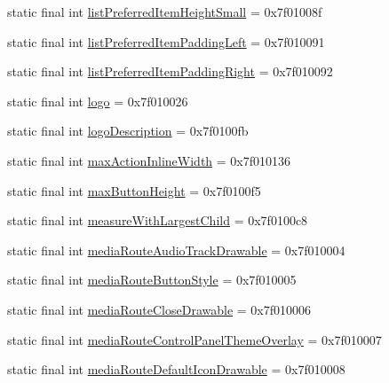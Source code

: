 \begin{CompactItemize}
\item 
static final int \hyperlink{classandroid_1_1support_1_1v7_1_1cardview_1_1_r_1_1attr_792da1eeef6f27123967a4cd0f42cfdf}{listPreferredItemHeightSmall} = 0x7f01008f
\item 
static final int \hyperlink{classandroid_1_1support_1_1v7_1_1cardview_1_1_r_1_1attr_8313b6168c0f795264cc752353fcb1e2}{listPreferredItemPaddingLeft} = 0x7f010091
\item 
static final int \hyperlink{classandroid_1_1support_1_1v7_1_1cardview_1_1_r_1_1attr_3029bf6174bce2f1c8516999074616a1}{listPreferredItemPaddingRight} = 0x7f010092
\item 
static final int \hyperlink{classandroid_1_1support_1_1v7_1_1cardview_1_1_r_1_1attr_1a58c8ae52263985ba349520bd1b1e27}{logo} = 0x7f010026
\item 
static final int \hyperlink{classandroid_1_1support_1_1v7_1_1cardview_1_1_r_1_1attr_024a5ac545ae24299cda4a30cd2bd0e1}{logoDescription} = 0x7f0100fb
\item 
static final int \hyperlink{classandroid_1_1support_1_1v7_1_1cardview_1_1_r_1_1attr_db6ef43310575c62b4c883cc7cd81e7f}{maxActionInlineWidth} = 0x7f010136
\item 
static final int \hyperlink{classandroid_1_1support_1_1v7_1_1cardview_1_1_r_1_1attr_470896082ba8fa7f73284b4773bbe6e7}{maxButtonHeight} = 0x7f0100f5
\item 
static final int \hyperlink{classandroid_1_1support_1_1v7_1_1cardview_1_1_r_1_1attr_91261c8906df5228943a8032a0daed07}{measureWithLargestChild} = 0x7f0100c8
\item 
static final int \hyperlink{classandroid_1_1support_1_1v7_1_1cardview_1_1_r_1_1attr_452bccf579df584f3beaf11fa5c4dcdd}{mediaRouteAudioTrackDrawable} = 0x7f010004
\item 
static final int \hyperlink{classandroid_1_1support_1_1v7_1_1cardview_1_1_r_1_1attr_f6286a03db239aa936e68171cf6be30d}{mediaRouteButtonStyle} = 0x7f010005
\item 
static final int \hyperlink{classandroid_1_1support_1_1v7_1_1cardview_1_1_r_1_1attr_b1aa6a0029edba60a2fe5c8eab03ac7c}{mediaRouteCloseDrawable} = 0x7f010006
\item 
static final int \hyperlink{classandroid_1_1support_1_1v7_1_1cardview_1_1_r_1_1attr_35baf4d7dbb4b3f19c254ce70037d98a}{mediaRouteControlPanelThemeOverlay} = 0x7f010007
\item 
static final int \hyperlink{classandroid_1_1support_1_1v7_1_1cardview_1_1_r_1_1attr_78cb2a6872073dd3b5ad969728f54474}{mediaRouteDefaultIconDrawable} = 0x7f010008

\end{CompactItemize}
